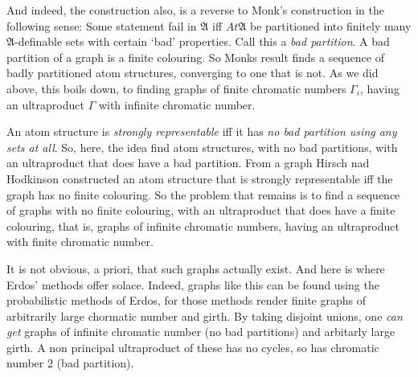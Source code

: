 \documentclass[12pt]{article}
\theoremstyle{definition}
\def\RCA{{\sf RCA}}
\def\RPEA{{\sf RPEA}}
\def\A{{\mathfrak{A}}}
\def\RDf{{\bf RDf}}
\def\RCA{{\sf RCA}}
\def\A{{\mathfrak{A}}}
\def\A{{\mathfrak{A}}}
\def\RCA{{\sf RCA}}
\def\RPEA{{\sf RPEA}}
\begin{document}
And indeed, the construction also, 
is a reverse to Monk's construction in the following sense:
Some statement fail in $\A$ iff $At\A$ 
be partitioned into finitely many $\A$-definable sets with certain 
`bad' properties. Call this a {\it bad partition}. 
A bad partition of a graph is a finite colouring. So Monks result finds a sequence of badly partitioned atom structures,
converging to one that is not. As we did above, this boils down, to finding graphs of finite chromatic numbers $\Gamma_i$, having an ultraproduct
$\Gamma$ with infinite chromatic number. 

An atom structure is {\it strongly representable} iff it 
has {\it no bad partition using any sets at all}. So, here, the idea  find atom structures, with no bad partitions, 
with an ultraproduct that does have a bad partition.
From a graph Hirsch nad Hodkinson constructed  an atom structure that is strongly representable iff the graph
has no finite colouring.  So the problem that remains is to find a sequence of graphs with no finite colouring, 
with an ultraproduct that does have a finite colouring, that is, graphs of infinite chromatic numbers, having an ultraproduct
with finite chromatic number.

 It is not obvious, a priori, that such graphs actually exist.
And here is where Erdos' methods offer solace. Indeed, graphs like this can be found using the probabilistic methods of Erdos, for those methods
render finite graphs of arbitrarily large chormatic number and girth. 
By taking disjoint unions, one {\it can get}  graphs of infinite chromatic number (no bad partitions) and arbitarly large girth. A non principal 
ultraproduct of these has no cycles, so has chromatic number 2 (bad partition).


\end{document}
